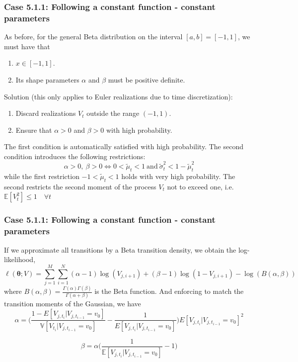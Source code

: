 \documentclass[aspectratio=169]{beamer}\usepackage[utf8]{inputenc}
\newcommand{\E}{\mathbb{E}}
\newcommand{\V}{\mathbb{V}}
\begin{document}
\begin{frame}\frametitle{ Case 5.1.1: Following a constant function - constant parameters }
As before, for the general Beta distribution on the interval $[a,b]=[-1,1]$, we must have that
\begin{enumerate}
\item $x \in [-1,1]$.
\item Its shape parameters $\alpha$ and $\beta$ must be positive definite.
\end{enumerate}
Solution (this only applies to Euler realizations due to time discretization):
\begin{enumerate}
\item Discard realizations $V_t$ outside the range $(-1,1)$.
\item Ensure that $\alpha >0$ and $\beta >0 $ with high probability.
\end{enumerate}
The first condition is automatically satisfied with high probability. The second condition introduces the following restrictions:
\begin{equation}
\alpha >0 ,\ \beta >0 \iff  0< \tilde{\mu}_t < 1  \ \text{and} \  \tilde{\sigma}_t^2 < 1 - \tilde{\mu}_t^2
\end{equation}
while the first restriction $ -1< \tilde{\mu}_t < 1$ holds with very high probability. The second restricts the second moment of the process $V_t$ not to exceed one,  i.e.  $\E[V_t^2] \leq 1 \quad \forall t$
\end{frame}


\begin{frame}\frametitle{ Case 5.1.1: Following a constant function - constant parameters }
If we approximate all transitions by a Beta transition density, we obtain the log-likelihood, 
\begin{equation}
\ell(\bm{\theta}; V)= \sum\limits_{j=1}^M \sum\limits_{i=1}^N (\alpha -1)\log(V_{j,i+1}) + (\beta -1) \log(1-V_{j,i+1}) - \log (B(\alpha, \beta))
\end{equation}
where $B(\alpha, \beta)=\frac{\Gamma (\alpha)\Gamma (\beta)}{\Gamma (\alpha + \beta)}$ is the Beta function. And enforcing to match the transition moments of the Gaussian, we have
\begin{equation} 
\alpha = \Big(  \frac{1-E[V_{j,t_i}| V_{j,t_{i-1}}=v_0]}{\V[V_{t_i}| V_{j,t_{i-1}}=v_0]} -\frac{1}{E[V_{j,t_i}| V_{j,t_{i-1}}=v_0]}   \Big)E[V_{j,t_i}| V_{j,t_{i-1}}=v_0]^2 \label{alph}
\end{equation}

\begin{equation} 
 \beta =  \alpha \Big(\frac{1}{\E[V_{j,t_i}| V_{j,t_{i-1}}=v_0]} -1 \Big) \label{gam}
\end{equation}
\end{frame}
\end{document}
